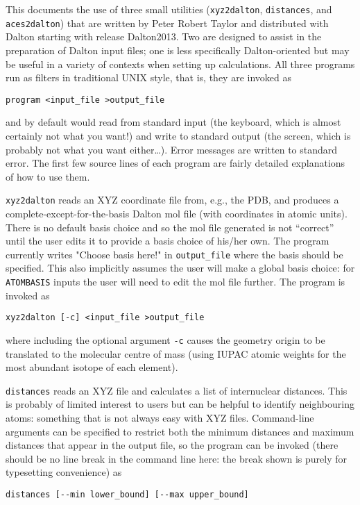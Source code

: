 This documents the use of three small utilities (\verb|xyz2dalton|,
\verb|distances|, and \verb|aces2dalton|) that are written by
Peter Robert Taylor and distributed with Dalton starting with release
Dalton2013.  Two are designed to assist in the preparation of Dalton
input files; one is less specifically Dalton-oriented but may be
useful in a variety of 
contexts when setting up calculations.  All three programs run as
filters in traditional UNIX style, that is, they are invoked as

\noindent
\verb|program <input_file >output_file|

\noindent
and by default would read from standard input (the keyboard, which is
almost certainly not what you want!) and write to standard output (the
screen, which is probably not what you want either\ldots).  Error
messages are written to standard error.  The 
first few source lines of each program are fairly detailed explanations of
how to use them.  

\verb|xyz2dalton| reads an XYZ coordinate file from, e.g., the PDB,
and produces a complete-except-for-the-basis 
Dalton mol file (with coordinates in atomic units).  There is no
default basis choice and so the mol file generated is not ``correct''
until the user edits it to provide a basis choice of his/her own.
The program currently writes "Choose basis here!" in \verb|output_file|
where the basis should be specified.  This also implicitly assumes the
user will make a global basis choice: for \verb|ATOMBASIS| inputs the
user will need to edit the mol file further.  The program is invoked
as

\noindent
\verb|xyz2dalton [-c] <input_file >output_file|

\noindent
where including the optional argument \verb|-c| causes the geometry
origin to be translated to the molecular centre of mass (using IUPAC
atomic weights for the most abundant isotope of each element).

\verb|distances| reads an XYZ file and calculates a list of
internuclear distances. 
This is probably of limited interest to users but can be helpful to
identify neighbouring atoms: something that is not always easy with
XYZ files.  Command-line arguments can be specified to restrict both the
minimum distances and maximum distances that appear in the output
file, so the program can be invoked (there should be no line break in
the command line here: the break shown is purely for typesetting
convenience) as 

\noindent
\verb|distances [--min lower_bound] [--max upper_bound]|


